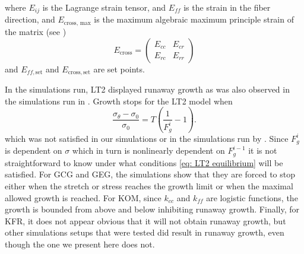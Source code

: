 where $E_{ij}$ is the Lagrange strain tensor, and $E_{ff}$ is the strain in the fiber direction, and $E_\text{cross, max}$ is the maximum algebraic maximum principle strain of the matrix (see \cite{Witzenburg2018})
\begin{equation*}
    E_\text{cross} = \begin{pmatrix}
        E_{cc} & E_{cr} \\
        E_{rc} & E_{rr}
    \end{pmatrix}
\end{equation*}
and $E_{ff, \mathrm{set}}$ and $E_\mathrm{cross, set}$ are set points. \par
In the simulations run, LT2 displayed runaway growth as was also observed in the simulations run in \cite{Witzenburg2018}. Growth stops for the LT2 model when \begin{equation*}
\label{eq: LT2 equilibrium}
    \frac{\sigma_{\theta} - \sigma_{0}}{\sigma_{0}} = T\left(\frac{1}{F_{g}^i} - 1\right).
\end{equation*}
which was not satisfied in our simulations or in the simulations run by \cite{Witzenburg2018}. Since $F_g^i$ is dependent on $\sigma$ which in turn is nonlinearly dependent on $F_g^{i-1}$ it is not straightforward to know under what conditions \ref{eq: LT2 equilibrium} will be satisfied. For GCG and GEG, the simulations show that they are forced to stop either when the stretch or stress reaches the growth limit or when the maximal allowed growth is reached. For KOM, since $k_{cc}$ and $k_{ff}$ are logistic functions, the growth is bounded from above and below inhibiting runaway growth. Finally, for KFR, it does not appear obvious that it will not obtain runaway growth, but other simulations setups that were tested did result in runaway growth, even though the one we present here does not.
